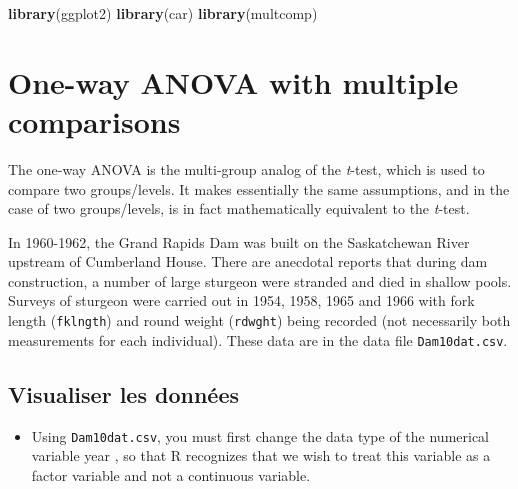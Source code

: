 \documentclass[
  12pt,
]{book}
\newenvironment{Shaded}{\begin{snugshade}}{\end{snugshade}}
\newcommand{\KeywordTok}[1]{\textcolor[rgb]{0.13,0.29,0.53}{\textbf{#1}}}
\newcommand{\NormalTok}[1]{#1}
\providecommand{\tightlist}{%
  \setlength{\itemsep}{0pt}\setlength{\parskip}{0pt}}
\begin{document}
\begin{Shaded}
\begin{Highlighting}[]
\KeywordTok{library}\NormalTok{(ggplot2)}
\KeywordTok{library}\NormalTok{(car)}
\KeywordTok{library}\NormalTok{(multcomp)}
\end{Highlighting}
\end{Shaded}

\hypertarget{one-way-anova-with-multiple-comparisons}{%
\section{One-way ANOVA with multiple comparisons}\label{one-way-anova-with-multiple-comparisons}}

The one-way ANOVA is the multi-group analog of the \emph{t}-test, which is used to compare two groups/levels. It makes essentially the same assumptions, and in the case of two groups/levels, is in fact mathematically equivalent to the \emph{t}-test.

In 1960-1962, the Grand Rapids Dam was built on the Saskatchewan River upstream of Cumberland House. There are anecdotal reports that during dam construction, a number of large sturgeon were stranded and died in shallow pools. Surveys of sturgeon were carried out in 1954, 1958, 1965 and 1966 with fork length (\texttt{fklngth}) and round weight (\texttt{rdwght}) being recorded (not necessarily both measurements for each individual). These data are in the data file \texttt{Dam10dat.csv}.

\hypertarget{visualiser-les-donnuxe9es}{%
\subsection{Visualiser les données}\label{visualiser-les-donnuxe9es}}

\begin{itemize}
\tightlist
\item
  Using \texttt{Dam10dat.csv}, you must first change the data type of the
  numerical variable year , so that R recognizes that we wish to treat this
  variable as a factor variable and not a continuous variable.
\end{itemize}
\end{document}
